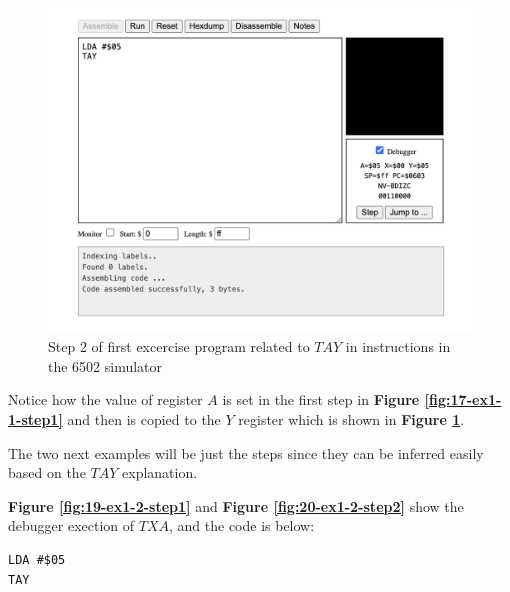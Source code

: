 \documentclass[a4paper]{article}
\begin{document}
\begin{figure}[H]
    \centering
    \includegraphics[width=1.0\textwidth]{res/images/q2/18-ex1-1-step2.png}
    \caption{Step 2 of first excercise program related to $TAY$ in instructions in the 6502 simulator}
    \label{fig:18-ex1-1-step2}
\end{figure}

Notice how the value of register $A$ is set in the first step in \textbf{Figure \ref{fig:17-ex1-1-step1}} and then is copied to the $Y$ register which is shown in \textbf{Figure \ref{fig:18-ex1-1-step2}}.

The two next examples will be just the steps since they can be inferred easily based on the $TAY$ explanation.

\textbf{Figure \ref{fig:19-ex1-2-step1}} and \textbf{Figure \ref{fig:20-ex1-2-step2}} show the debugger exection of $TXA$, and the code is below:


\begin{lstlisting}[style=6502asm]
LDA #$05
TAY
\end{lstlisting}
\end{document}
